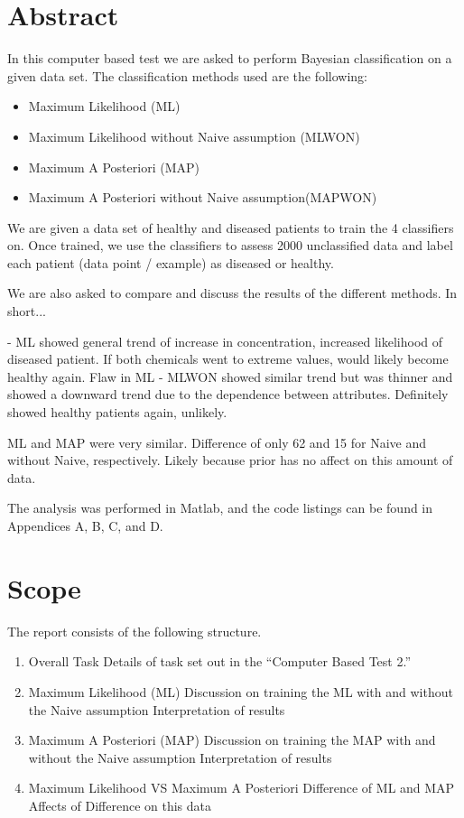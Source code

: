 \section{Abstract}
In this computer based test we are asked to perform Bayesian classification on a given data set. The classification methods used are the following:
\begin{itemize}
	\item Maximum Likelihood (ML)
	\item Maximum Likelihood without Naive assumption (MLWON)
	\item Maximum A Posteriori (MAP)
	\item Maximum A Posteriori without Naive assumption(MAPWON)
\end{itemize}

We are given a data set of healthy and diseased patients to train the 4 classifiers on. Once trained, we use the classifiers to assess 2000 unclassified data and label each patient (data point / example) as diseased or healthy.

We are also asked to compare and discuss the results of the different methods. In short...

- ML showed general trend of increase in concentration, increased likelihood of diseased patient. If both chemicals went to extreme values, would likely become healthy again. Flaw in ML
- MLWON showed similar trend but was thinner and showed a downward trend due to the dependence between attributes. Definitely showed healthy patients again, unlikely.

ML and MAP were very similar. Difference of only 62 and 15 for Naive and without Naive, respectively. Likely because prior has no affect on this amount of data.

The analysis was performed in Matlab, and the code listings can be found in Appendices A, B, C, and D.

\section{Scope}
The report consists of the following structure.

\begin{enumerate}
	\item Overall Task
		\subitem Details of task set out in the ``Computer Based Test 2.''
	\item Maximum Likelihood (ML)
		\subitem Discussion on training the ML with and without the Naive assumption
		\subitem Interpretation of results
	\item Maximum A Posteriori (MAP)
			\subitem Discussion on training the MAP with and without the Naive assumption
			\subitem Interpretation of results
	\item Maximum Likelihood VS Maximum A Posteriori
			\subitem Difference of ML and MAP
			\subitem Affects of Difference on this data 
\end{enumerate}

